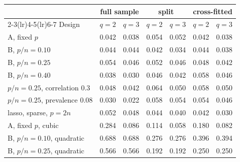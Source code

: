 \begin{tabular}{lrrrrrr}
\toprule
 & \multicolumn{2}{c}{full sample} & \multicolumn{2}{c}{split} & \multicolumn{2}{c}{cross-fitted} \\
\cmidrule(lr){2-3}\cmidrule(lr){4-5}\cmidrule(lr){6-7}
Design & $q=2$ & $q=3$ & $q=2$ & $q=3$ & $q=2$ & $q=3$ \\
\midrule
A, fixed $p$ & 0.042 & 0.038 & 0.054 & 0.052 & 0.042 & 0.038 \\
B, $p/n = 0.10$ & 0.044 & 0.044 & 0.042 & 0.034 & 0.044 & 0.038 \\
B, $p/n = 0.25$ & 0.054 & 0.046 & 0.052 & 0.046 & 0.048 & 0.042 \\
B, $p/n = 0.40$ & 0.038 & 0.030 & 0.046 & 0.042 & 0.058 & 0.046 \\
$p/n = 0.25$, correlation $0.3$ & 0.048 & 0.042 & 0.064 & 0.050 & 0.058 & 0.050 \\
$p/n = 0.25$, prevalence $0.08$ & 0.030 & 0.022 & 0.058 & 0.054 & 0.054 & 0.046 \\
lasso, sparse, $p = 2n$ & 0.052 & 0.048 & 0.044 & 0.040 & 0.042 & 0.030 \\
\midrule
A, fixed $p$, cubic & 0.284 & 0.086 & 0.114 & 0.058 & 0.180 & 0.082 \\
B, $p/n = 0.10$, quadratic & 0.688 & 0.688 & 0.276 & 0.276 & 0.396 & 0.394 \\
B, $p/n = 0.25$, quadratic & 0.566 & 0.566 & 0.192 & 0.192 & 0.250 & 0.250 \\
\bottomrule
\end{tabular}

